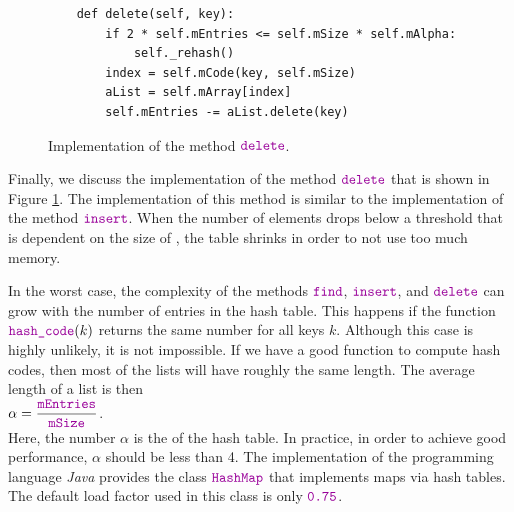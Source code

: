 \begin{figure}[!ht]
\centering
\begin{verbatim}
    def delete(self, key):
        if 2 * self.mEntries <= self.mSize * self.mAlpha:
            self._rehash()
        index = self.mCode(key, self.mSize)
        aList = self.mArray[index]
        self.mEntries -= aList.delete(key)
\end{verbatim}
\vspace*{-0.3cm}
\caption{Implementation of the method $\mytt{delete}$.}
\label{fig:HashMap.ipynb-delete}
\end{figure}

Finally, we discuss the implementation of the method $\mytt{delete}$ that is shown in Figure
\ref{fig:HashMap.ipynb-delete}.  The implementation of this method is similar to the implementation
of the method $\mytt{insert}$.  When the number of elements drops below a threshold that is dependent on the
size of , the table shrinks in order to not use too much memory.

In the worst case, the complexity of
the methods  $\mytt{find}$, $\mytt{insert}$, and $\mytt{delete}$ can grow  with the number
of entries in the hash table.  This happens if the function 
$\mytt{hash\_code}(k)$ returns the same number for all keys $k$.  Although this case is
highly unlikely, it is not impossible.  If we have a good function to compute hash codes, then
most of the  lists will have roughly the same length.  The average length of a list is then
 \\[0.2cm]
\hspace*{1.3cm}
 $\alpha = \ds \frac{\mytt{mEntries}}{\mytt{mSize}}$. 
\\[0.2cm]
Here, the number $\alpha$ is the  of the hash table.  In practice, in order to
achieve good performance, $\alpha$ should be less than 4.  The implementation of the programming
language \textsl{Java} provides the class  $\mytt{HashMap}$ that implements maps via hash tables.
The default load factor used in this class is only $\mytt{0.75}$.

